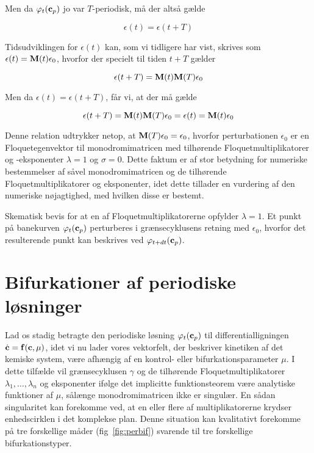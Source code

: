 Men da $\varphi_{t}({\bf c}_p)$ jo var $T$-periodisk,
m{\aa} der alts{\aa} g{\ae}lde

\begin{equation}
 \epsilon (t) = \epsilon (t+T)
\end{equation}

Tidsudviklingen for $\epsilon (t)$ kan, som vi tidligere
har vist, skrives som $\epsilon (t) = {\bf
M}(t)\epsilon_0$, hvorfor der specielt til tiden $t+T$
g{\ae}lder

\begin{equation}
 \epsilon (t+T) = {\bf M}(t){\bf M}(T)\epsilon_0
\end{equation}

Men da $\epsilon (t) = \epsilon (t+T)$, f{\aa}r vi, at der
m{\aa} g{\ae}lde

\begin{equation}
  \epsilon (t+T) = {\bf M}(t){\bf M}(T)\epsilon_0 = 
  \epsilon (t) = {\bf M}(t)\epsilon_0
\end{equation}

Denne relation udtrykker netop, at ${\bf M}(T)\epsilon_0 =
\epsilon_0$, hvorfor perturbationen $\epsilon_0$ er en
Floquetegenvektor til monodromimatricen med tilh{\o}rende
Floquet\-multi\-plikatorer og -eksponenter $\lambda=1$ og
$\sigma=0$. Dette faktum er af stor betydning for numeriske
bestemmelser af s{\aa}vel monodromimatricen og de
tilh{\o}rende Floquetmultiplikatorer og eksponenter, idet
dette tillader en vurdering af den numeriske
n{\o}jagtighed, med hvilken disse er bestemt.

{
\caption{\protect\capsize
Skematisk bevis for at en af Floquetmultiplikatorerne
opfylder $\lambda=1$. Et punkt p{\aa} banekurven
$\varphi_t({\bf c}_p)$ perturberes i gr{\ae}nsecyklusens
retning med $\epsilon_0$, hvorfor det resulterende punkt
kan beskrives ved $\varphi_{t+dt}({\bf c}_p)$.}
\label{fig:lambda=1}
}

\section{Bifurkationer af periodiske l{\o}sninger}
Lad os stadig betragte den periodiske l{\o}sning
$\varphi_t({\bf c}_p)$ til differentiallig\-ningen
$\dot{\bf c} = {\bf f}({\bf c},\mu)$, idet vi nu lader
vores vektorfelt, der beskriver kinetiken af det kemiske
sy\-stem, v{\ae}re afh{\ae}ngig af en kontrol- eller
bifurkationsparameter $\mu$. I dette tilf{\ae}lde vil
gr{\ae}nsecyklusen $\gamma$ og de tilh{\o}rende
Floquetmultiplikatorer $\lambda_1,\ldots,\lambda_n$ og
eksponenter if{\o}lge det implicitte funktionsteorem
v{\ae}re ana\-lytiske funktioner af $\mu$, s{\aa}l{\ae}nge
monodromimatricen ikke er singul{\ae}r. En s{\aa}dan
singularitet kan forekomme ved, at en eller flere af
multiplikatorerne krydser enhedscirklen i det komplekse
plan. Denne situation kan kvalitativt forekomme p{\aa} tre
forskellige m{\aa}der (fig~\ref{fig:perbif}) svarende til
tre forskellige bifurkationstyper.

